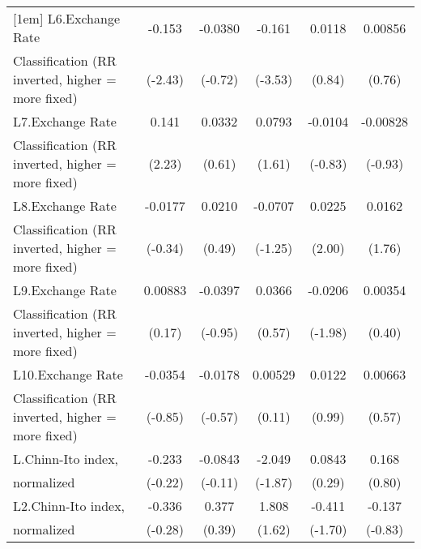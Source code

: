 {\begin{tabular}{l*{5}{c}}
[1em]
L6.Exchange Rate    &      -0.153\sym{*}  &     -0.0380         &      -0.161\sym{***}&      0.0118         &     0.00856         \\
Classification (RR inverted, higher = more fixed)&     (-2.43)         &     (-0.72)         &     (-3.53)         &      (0.84)         &      (0.76)         \\
[1em]
L7.Exchange Rate    &       0.141\sym{*}  &      0.0332         &      0.0793         &     -0.0104         &    -0.00828         \\
Classification (RR inverted, higher = more fixed)&      (2.23)         &      (0.61)         &      (1.61)         &     (-0.83)         &     (-0.93)         \\
[1em]
L8.Exchange Rate    &     -0.0177         &      0.0210         &     -0.0707         &      0.0225\sym{*}  &      0.0162         \\
Classification (RR inverted, higher = more fixed)&     (-0.34)         &      (0.49)         &     (-1.25)         &      (2.00)         &      (1.76)         \\
[1em]
L9.Exchange Rate    &     0.00883         &     -0.0397         &      0.0366         &     -0.0206\sym{*}  &     0.00354         \\
Classification (RR inverted, higher = more fixed)&      (0.17)         &     (-0.95)         &      (0.57)         &     (-1.98)         &      (0.40)         \\
[1em]
L10.Exchange Rate   &     -0.0354         &     -0.0178         &     0.00529         &      0.0122         &     0.00663         \\
Classification (RR inverted, higher = more fixed)&     (-0.85)         &     (-0.57)         &      (0.11)         &      (0.99)         &      (0.57)         \\
[1em]
L.Chinn-Ito index,  &      -0.233         &     -0.0843         &      -2.049         &      0.0843         &       0.168         \\
normalized          &     (-0.22)         &     (-0.11)         &     (-1.87)         &      (0.29)         &      (0.80)         \\
[1em]
L2.Chinn-Ito index, &      -0.336         &       0.377         &       1.808         &      -0.411         &      -0.137         \\
normalized          &     (-0.28)         &      (0.39)         &      (1.62)         &     (-1.70)         &     (-0.83)         \\

\end{tabular}}
